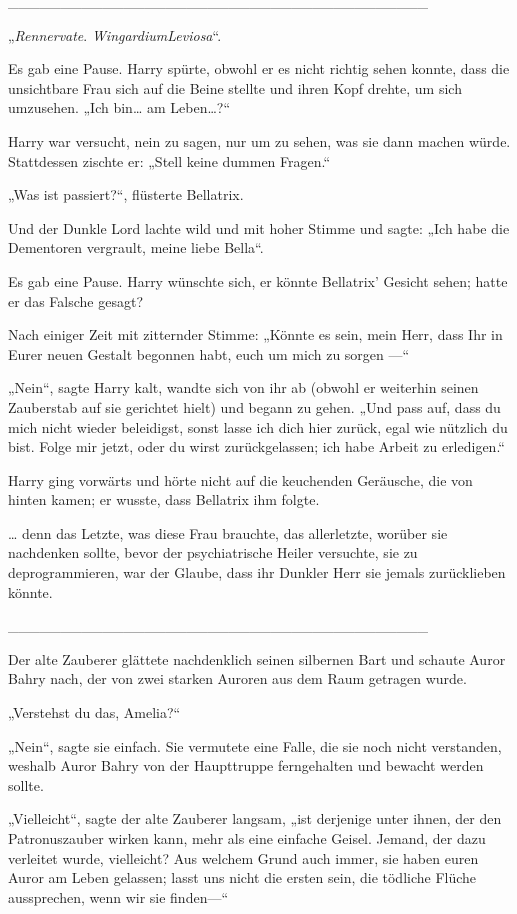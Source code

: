 {\_\_\_\_\_\_\_\_\_\_\_\_\_\_\_\_\_\_\_\_\_\_\_\_\_\_\_\_\_\_\_\_\_\_\_\_\_\_\_\_

„\emph{Rennervate}. \emph{WingardiumLeviosa}“.

Es gab eine Pause. Harry spürte, obwohl er es nicht richtig sehen konnte, dass die unsichtbare Frau sich auf die Beine stellte und ihren Kopf drehte, um sich umzusehen. „Ich bin… am Leben…?“

Harry war versucht, nein zu sagen, nur um zu sehen, was sie dann machen würde. Stattdessen zischte er: „Stell keine dummen Fragen.“

„Was ist passiert?“, flüsterte Bellatrix.

Und der Dunkle Lord lachte wild und mit hoher Stimme und sagte: „Ich habe die Dementoren vergrault, meine liebe Bella“.

Es gab eine Pause. Harry wünschte sich, er könnte Bellatrix' Gesicht sehen; hatte er das Falsche gesagt?

Nach einiger Zeit mit zitternder Stimme: „Könnte es sein, mein Herr, dass Ihr in Eurer neuen Gestalt begonnen habt, euch um mich zu sorgen —“

„Nein“, sagte Harry kalt, wandte sich von ihr ab (obwohl er weiterhin seinen Zauberstab auf sie gerichtet hielt) und begann zu gehen. „Und pass auf, dass du mich nicht wieder beleidigst, sonst lasse ich dich hier zurück, egal wie nützlich du bist. Folge mir jetzt, oder du wirst zurückgelassen; ich habe Arbeit zu erledigen.“

Harry ging vorwärts und hörte nicht auf die keuchenden Geräusche, die von hinten kamen; er wusste, dass Bellatrix ihm folgte.

… denn das Letzte, was diese Frau brauchte, das allerletzte, worüber sie nachdenken sollte, bevor der psychiatrische Heiler versuchte, sie zu deprogrammieren, war der Glaube, dass ihr Dunkler Herr sie jemals zurücklieben könnte.

\_\_\_\_\_\_\_\_\_\_\_\_\_\_\_\_\_\_\_\_\_\_\_\_\_\_\_\_\_\_\_\_\_\_\_\_\_\_\_\_

Der alte Zauberer glättete nachdenklich seinen silbernen Bart und schaute Auror Bahry nach, der von zwei starken Auroren aus dem Raum getragen wurde.

„Verstehst du das, Amelia?“

„Nein“, sagte sie einfach. Sie vermutete eine Falle, die sie noch nicht verstanden, weshalb Auror Bahry von der Haupttruppe ferngehalten und bewacht werden sollte.

„Vielleicht“, sagte der alte Zauberer langsam, „ist derjenige unter ihnen, der den Patronuszauber wirken kann, mehr als eine einfache Geisel. Jemand, der dazu verleitet wurde, vielleicht? Aus welchem Grund auch immer, sie haben euren Auror am Leben gelassen; lasst uns nicht die ersten sein, die tödliche Flüche aussprechen, wenn wir sie finden—“

}
